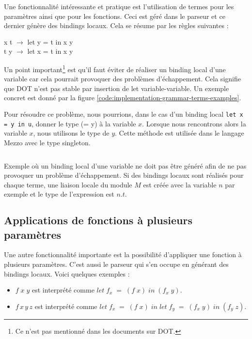 Une fonctionnalité intéressante et pratique est l'utilisation de
termes pour les paramètres ainsi que pour les fonctions. Ceci
est géré dans le parseur et ce dernier génère des bindings locaux. Cela se
résume par les règles suivantes :

\begin{center}
  x t $\rightarrow$ let y = t in x y \\
  t y $\rightarrow$ let x = t in x y
\end{center}

Un point important\footnote{Ce n'est pas mentionné dans les documents sur
DOT.} est qu'il faut éviter de réaliser un binding local d'une variable car
cela pourrait provoquer des problèmes d'échappement. Cela signifie que DOT n'est
pas stable par insertion de let variable-variable. Un exemple concret est donné
par la figure \ref{code:implementation-grammar-terms-examples}.

Pour résoudre ce problème, nous pourrions, dans le cas d'un binding local
\verb|let x = y in u|, donner le type (= y) à la variable $x$. Lorsque nous
rencontrons alors la variable $x$, nous utilisons le type de $y$. Cette méthode
est utilisée dans le langage Mezzo\cite{mezzo} avec le type singleton.

\begin{listing}
  \inputminted{OCaml}{codes/terms_binding_variable.rml}
  \caption{Exemple où un binding local d'une variable ne doit pas être généré
    afin de ne pas provoquer un problème d'échappement. Si des bindings locaux
    sont réalisés pour chaque terme, une liaison locale du module $M$ est
    créée avec la variable $n$ par exemple et le type de l'expression est $n.t$.}
  \label{code:implementation-grammar-terms-examples}
\end{listing}

\subsection*{Applications de fonctions à plusieurs paramètres}

Une autre fonctionnalité importante est la possibilité d'appliquer une fonction
à plusieurs
paramètres. C'est aussi le parseur qui s'en occupe en générant
des bindings locaux. Voici quelques exemples :

\begin{itemize}
\item $f \; x \; y$ est interprété comme $let \; f_{x} \; = \; (f \; x) \; in \;
  (f_{x} \; y)$.
\item $f \,  x \, y \, z$ est interprété comme $let \; f_{x} \; = \; (f \; x) \;
  in \; let \; f_{y} \; = \; (f_{x} \; y) \; in \; (f_{y} \; z)$.
\end{itemize}

